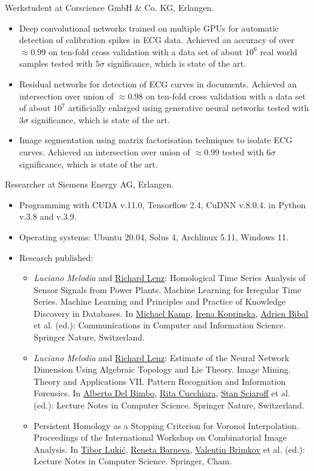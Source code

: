 \documentclass[a4paper, 11pt]{article}
\newcommand{\years}[1]{\marginnote{\scriptsize #1}}
\begin{document}
	\years{2021--22} Werkstudent at Corscience GmbH \& Co. KG, Erlangen.
	\begin{itemize}
		\item Deep convolutional networks trained on multiple GPUs for automatic detection of calibration spikes in ECG data. Achieved an accuracy of over $\approx 0.99$ on ten-fold cross validation with a data set of about $10^6$ real world samples tested with $5 \sigma$ significance, which is state of the art.

		\item Residual networks for detection of ECG curves in documents. Achieved an intersection over union of $\approx 0.98$ on ten-fold cross validation with a data set of about $10^7$ artificially enlarged using generative neural networks tested with $3\sigma$ significance, which is state of the art.

		\item Image segmentation using matrix factorisation techniques to isolate ECG curves. Achieved an intersection over union of $\approx 0.99$ tested with $6 \sigma$ significance, which is state of the art.
	\end{itemize}
	\years{2019--21} Researcher at Siemens Energy AG, Erlangen.
	\begin{itemize}
		\item Programming with CUDA v.11.0, Tensorflow 2.4, CuDNN v.8.0.4. in Python v.3.8 and v.3.9.

		\item Operating systems: Ubuntu 20.04, Solus 4, Archlinux 5.11, Windows 11. 

		\item Research published:
		\begin{itemize}
			\item \emph{Luciano Melodia} and \ul{Richard Lenz}: Homological Time Series Analysis of Sensor Signals from Power Plants. Machine Learning for Irregular Time Series. Machine Learning and Principles and Practice of Knowledge Discovery in Databases. In \ul{Michael Kamp}, \ul{Irena Koprinska}, \ul{Adrien Bibal} et al. (ed.): Communications in Computer and Information Science. Springer Nature, Switzerland.
			\item \emph{Luciano Melodia} and \ul{Richard Lenz}: Estimate of the Neural Network Dimension Using Algebraic Topology and Lie Theory. Image Mining. Theory and Applications VII. Pattern Recognition and Information Forensics. In \ul{Alberto Del Bimbo}, \ul{Rita Cucchiara}, \ul{Stan Sciaroff} et al. (ed.): Lecture Notes in Computer Science. Springer Nature, Switzerland.
			\item Persistent Homology as a Stopping Criterion for Voronoi Interpolation. Proceedings of the International Workshop on Combinatorial Image Analysis. In \ul{Tibor Lukić}, \ul{Reneta Barneva}, \ul{Valentin Brimkov} et al. (ed.): Lecture Notes in Computer Science. Springer, Cham.
		\end{itemize}
	\end{itemize}
\end{document}
